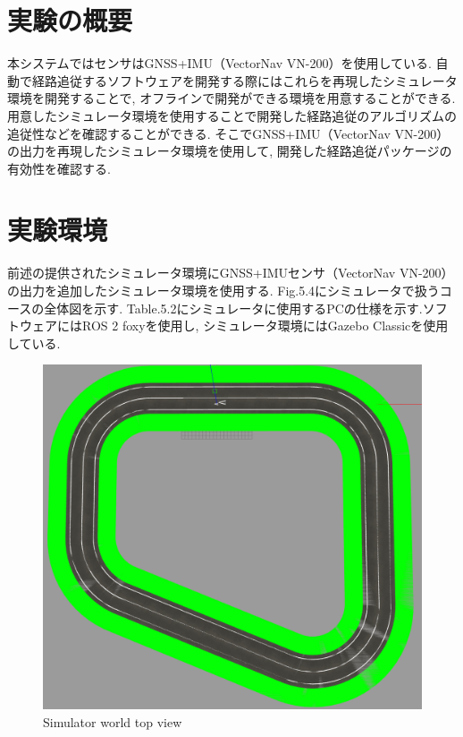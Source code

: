 \section{実験の概要}
本システムではセンサはGNSS+IMU（VectorNav VN-200）を使用している.
自動で経路追従するソフトウェアを開発する際にはこれらを再現したシミュレータ環境を開発することで, オフラインで開発ができる環境を用意することができる.
用意したシミュレータ環境を使用することで開発した経路追従のアルゴリズムの追従性などを確認することができる.
そこでGNSS+IMU（VectorNav VN-200）の出力を再現したシミュレータ環境を使用して, 開発した経路追従パッケージの有効性を確認する.


\section{実験環境}
前述の提供されたシミュレータ環境にGNSS+IMUセンサ（VectorNav VN-200）の出力を追加したシミュレータ環境を使用する.
Fig.5.4にシミュレータで扱うコースの全体図を示す.
Table.5.2にシミュレータに使用するPCの仕様を示す.ソフトウェアにはROS 2 foxyを使用し, シミュレータ環境にはGazebo Classicを使用している.

\begin{figure}[H]
  \centering
 \includegraphics[keepaspectratio, scale=0.3]
      {images/topviewsim.png}
 \caption{Simulator world top view}
 \label{fig:simulator}
\end{figure}

